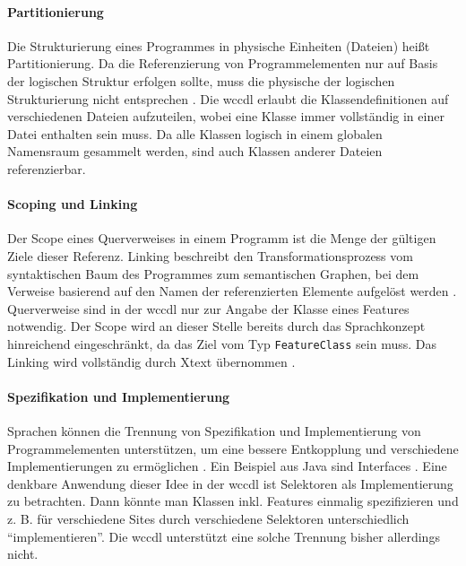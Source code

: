     \paragraph*{Partitionierung}
    Die Strukturierung eines Programmes in physische Einheiten (Dateien) heißt Partitionierung.
    Da die Referenzierung von Programmelementen nur auf Basis der logischen Struktur erfolgen sollte,
    muss die physische der logischen Strukturierung nicht entsprechen
    \cite[Kapitel 5.1.2]{voelter:DslEngineering}.
    Die \gls{wccdl} erlaubt die Klassendefinitionen auf verschiedenen Dateien
    aufzuteilen, wobei eine Klasse immer vollständig in einer Datei enthalten sein muss.
    Da alle Klassen logisch in einem globalen Namensraum gesammelt werden,
    sind auch Klassen anderer Dateien referenzierbar.

    \paragraph*{Scoping und Linking}
    Der Scope eines Querverweises in einem Programm ist die Menge der
    gültigen Ziele dieser Referenz.
    Linking beschreibt den Transformationsprozess vom syntaktischen Baum des Programmes
    zum semantischen Graphen, bei dem Verweise basierend auf den Namen der referenzierten
    Elemente aufgelöst werden
    \cite[Kapitel 8]{voelter:DslEngineering}.
    Querverweise sind in der \gls{wccdl} nur zur Angabe der Klasse eines Features notwendig.
    Der Scope wird an dieser Stelle bereits durch das Sprachkonzept hinreichend
    eingeschränkt, da das Ziel vom Typ
    \texttt{FeatureClass} sein muss.
    Das Linking wird vollständig durch Xtext übernommen
    \cite[Kapitel "`Language Implementation"']{xtext:documentation}.

    \paragraph*{Spezifikation und Implementierung}
    Sprachen können die Trennung von Spezifikation und Implementierung von
    Programmelementen unterstützen, um eine bessere Entkopplung und verschiedene
    Implementierungen zu ermöglichen \cite[Kapitel 5.1.3]{voelter:DslEngineering}.
    Ein Beispiel aus Java sind Interfaces \cite[Kapitel 9]{oracle:javaSpec}.
    Eine denkbare Anwendung dieser Idee in der \gls{wccdl} ist Selektoren als
    Implementierung zu betrachten. Dann könnte man Klassen inkl. Features einmalig spezifizieren
    und z. B. für verschiedene Sites durch verschiedene Selektoren unterschiedlich "`implementieren"'.
    Die \gls{wccdl} unterstützt eine solche Trennung bisher allerdings nicht.

